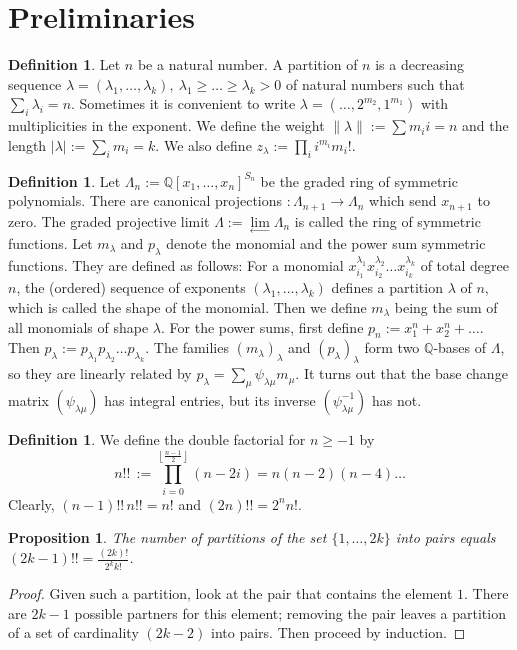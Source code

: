\documentclass{amsart}
\newcommand{\coloneqq}{:=}
\newcommand{\Q}{\mathbb{Q}}
\theoremstyle{plain}
\newtheorem{proposition}[theorem]{Proposition}
\theoremstyle{definition}
\newtheorem{definition}[theorem]{Definition}
\theoremstyle{remark}
\begin{document}
\section{Preliminaries}
\begin{definition}
Let $n$ be a natural number. A partition of $n$ is a decreasing sequence $\lambda = (\lambda_1,\ldots,\lambda_k),\ \lambda_1\geq\ldots\geq\lambda_k>0$ of natural numbers such that $\sum_i \lambda_i =n$. Sometimes it is convenient to write $\lambda = (\ldots,2^{m_2},1^{m_1})$ with multiplicities in the exponent.
We define the weight $\|\lambda\| :=\sum m_i i =n$ and the length $|\lambda| := \sum_i m_i =k$. 
We also define $z_\lambda \coloneqq\prod_i i^{m_i} m_i!$. 
\end{definition}
\begin{definition} \label{SymFun}
Let $\Lambda_n := \Q[x_1,\ldots,x_n]^{S_n}$ be the graded ring of symmetric polynomials. There are canonical projections $: \Lambda_{n+1}\rightarrow\Lambda_n$ which send $x_{n+1}$ to zero. The graded projective limit
$\Lambda:=\lim\limits_{\leftarrow}\Lambda_n$ is called the ring of symmetric functions.
Let $m_\lambda$ and $p_\lambda$ denote the monomial and the power sum symmetric functions. They are defined as follows: For a monomial $x_{i_1}^{\lambda_1}x_{i_2}^{\lambda_2}\ldots x_{i_k}^{\lambda_k}$ of total degree $n$, the (ordered) sequence of exponents $(\lambda_1,\ldots,\lambda_k)$ defines a partition $\lambda$ of $n$, which is called the shape of the monomial. Then we define $m_\lambda$ being the sum of all monomials of shape $\lambda$. 
For the power sums, first define $p_n := x_1^n + x_2^n + \ldots$. 
Then $p_\lambda := p_{\lambda_1}p_{\lambda_2}\ldots p_{\lambda_k}$.
The families $(m_\lambda)_\lambda$ and $(p_\lambda)_\lambda$ form two $\Q$-bases of $\Lambda$, so they are linearly related by $p_\lambda = \sum_{\mu} \psi_{\lambda\mu}m_\mu$. It turns out that the base change matrix $(\psi_{\lambda\mu})$ has integral entries, but its inverse $(\psi_{\lambda\mu}^{-1})$ has not.
\end{definition}
\begin{definition}\label{doublefactorial}
We define the double factorial for $ n\geq -1$ by 
$$n!! \,\coloneqq \prod_{i=0}^{\left\lfloor\!\frac{n-1}{2}\!\right\rfloor }(n-2i)=n(n-2)(n-4)\ldots $$
Clearly, $(n-1)!!\,n!! = n!$ and $(2n)!! = 2^n n!$.
\end{definition}
\begin{proposition} \label{partitioncount}
The number of partitions of the set $\{1,\ldots,2k\}$ into pairs equals $(2k-1)!! = \frac{(2k)!}{2^kk!}$.
\end{proposition}
\begin{proof}
Given such a partition, look at the pair that contains the element $1$. There are $2k-1$ possible partners for this element; removing the pair leaves a partition of a set of cardinality $(2k-2)$ into pairs. Then proceed by induction.
\end{proof}
\end{document}
